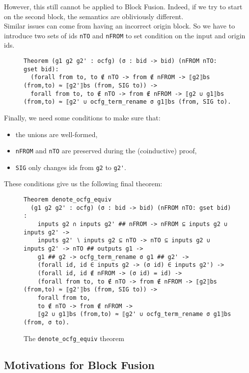 \documentclass[11pt]{article}
\newcommand{\inlinecoq}[1]{\mbox{\lstinline[style=customcoq,columns=fixed,basewidth=.48em]{#1}}}
\newcommand{\ilc}[1]{\inlinecoq{#1}}
\begin{document}
However, this still cannot be applied to Block Fusion. Indeed, if we try to start on the second block, the semantics are obliviously different.\\
Similar issues can come from having an incorrect origin block. So we have to introduce two sets of ids \ilc{nTO} and \ilc{nFROM} to set condition on the input and origin ids.\\
\begin{figure}
  \begin{lstlisting}[style=customcoq,basicstyle=\small\ttfamily]
Theorem (g1 g2 g2' : ocfg) (σ : bid -> bid) (nFROM nTO: gset bid):
  (forall from to, to ∉ nTO -> from ∉ nFROM -> ⟦g2⟧bs (from,to) ≈ ⟦g2'⟧bs (from, SIG to)) ->
  forall from to, to ∉ nTO -> from ∉ nFROM -> ⟦g2 ∪ g1⟧bs (from,to) ≈ ⟦g2' ∪ ocfg_term_rename σ g1⟧bs (from, SIG to).
  \end{lstlisting}
\end{figure}

Finally, we need some conditions to make sure that:\begin{itemize}
  \item the unions are well-formed,
  \item \ilc{nFROM} and \ilc{nTO} are preserved during the (coinductive) proof,
  \item \ilc{SIG} only changes ids from \ilc{g2} to \ilc{g2'}.
\end{itemize}

These conditions give us the following final theorem:
\begin{figure}
\begin{lstlisting}[style=customcoq,basicstyle=\small\ttfamily]
Theorem denote_ocfg_equiv
  (g1 g2 g2' : ocfg) (σ : bid -> bid) (nFROM nTO: gset bid) :
    inputs g2 ∩ inputs g2' ## nFROM -> nFROM ⊆ inputs g2 ∪ inputs g2' ->
    inputs g2' ∖ inputs g2 ⊆ nTO -> nTO ⊆ inputs g2 ∪ inputs g2' -> nTO ## outputs g1 ->
    g1 ## g2 -> ocfg_term_rename σ g1 ## g2' ->
    (forall id, id ∈ inputs g2 -> (σ id) ∈ inputs g2') ->
    (forall id, id ∉ nFROM -> (σ id) = id) ->
    (forall from to, to ∉ nTO -> from ∉ nFROM -> ⟦g2⟧bs (from,to) ≈ ⟦g2'⟧bs (from, SIG to)) ->
    forall from to,
    to ∉ nTO -> from ∉ nFROM ->
    ⟦g2 ∪ g1⟧bs (from,to) ≈ ⟦g2' ∪ ocfg_term_rename σ g1⟧bs (from, σ to).
  \end{lstlisting}
  \caption{The \ilc{denote_ocfg_equiv} theorem}
\end{figure}

\subsection{Motivations for Block Fusion}
\end{document}
